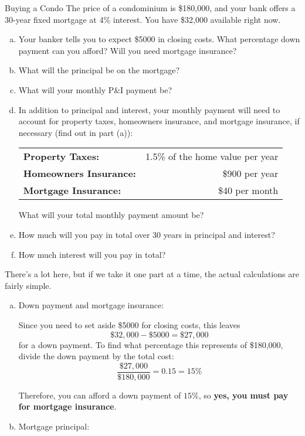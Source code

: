 \begin{example}{Buying a Condo}
The price of a condominium is \$180,000, and your bank offers a 30-year fixed mortgage at 4\% interest.  You have \$32,000 available right now.
\begin{enumerate}[(a)]
\item Your banker tells you to expect \$5000 in closing costs.  What percentage down payment can you afford?  Will you need mortgage insurance?
\item What will the principal be on the mortgage?
\item What will your monthly P\&I payment be?
\item In addition to principal and interest, your monthly payment will need to account for property taxes, homeowners insurance, and mortgage insurance, if necessary (find out in part (a)):
\begin{center}
\begin{tabular}{l r}
\textbf{Property Taxes:} & 1.5\% of the home value per year\\
\textbf{Homeowners Insurance:} & \$900 per year\\
\textbf{Mortgage Insurance:} & \$40 per month
\end{tabular}
\end{center}
What will your total monthly payment amount be?
\item How much will you pay in total over 30 years in principal and interest?
\item How much interest will you pay in total?
\end{enumerate}

\sol
There's a lot here, but if we take it one part at a time, the actual calculations are fairly simple.

\begin{enumerate}[(a)]
\item Down payment and mortgage insurance:

Since you need to set aside \$5000 for closing costs, this leaves \[\$32,000 - \$5000 = \$27,000\] for a down payment.  To find what percentage this represents of \$180,000, divide the down payment by the total cost:
\[\dfrac{\$27,000}{\$180,000} = 0.15 = 15\%\]

Therefore, you can afford a down payment of $\boxed{15\%}$, so \textbf{yes, you must pay for mortgage insurance}.

\item Mortgage principal:


\end{enumerate}
\end{example}
